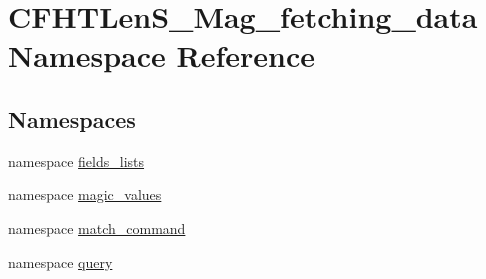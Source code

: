 \hypertarget{namespaceCFHTLenS__Mag__fetching__data}{\section{C\-F\-H\-T\-Len\-S\-\_\-\-Mag\-\_\-fetching\-\_\-data Namespace Reference}
\label{namespaceCFHTLenS__Mag__fetching__data}
}
\subsection*{Namespaces}
\begin{DoxyCompactItemize}
\item 
namespace \hyperlink{namespaceCFHTLenS__Mag__fetching__data_1_1fields__lists}{fields\-\_\-lists}
\item 
namespace \hyperlink{namespaceCFHTLenS__Mag__fetching__data_1_1magic__values}{magic\-\_\-values}
\item 
namespace \hyperlink{namespaceCFHTLenS__Mag__fetching__data_1_1match__command}{match\-\_\-command}
\item 
namespace \hyperlink{namespaceCFHTLenS__Mag__fetching__data_1_1query}{query}
\end{DoxyCompactItemize}
